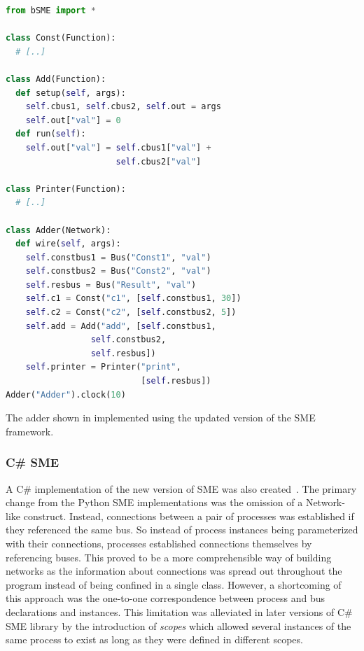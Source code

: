\begin{widefigure}
  \begin{multicols}{2}
    \small
\begin{lstlisting}[language=python]
from bSME import *

class Const(Function):
  # [..]

class Add(Function):
  def setup(self, args):
    self.cbus1, self.cbus2, self.out = args
    self.out["val"] = 0
  def run(self):
    self.out["val"] = self.cbus1["val"] +
                      self.cbus2["val"]

class Printer(Function):
  # [..]

class Adder(Network):
  def wire(self, args):
    self.constbus1 = Bus("Const1", "val")
    self.constbus2 = Bus("Const2", "val")
    self.resbus = Bus("Result", "val")
    self.c1 = Const("c1", [self.constbus1, 30])
    self.c2 = Const("c2", [self.constbus2, 5])
    self.add = Add("add", [self.constbus1,
                 self.constbus2,
                 self.resbus])
    self.printer = Printer("print",
                           [self.resbus])
Adder("Adder").clock(10)
\end{lstlisting}
  \end{multicols}
\caption{The adder shown in  implemented using the updated
  version of the SME framework.}
\label{fig:adder2}
\end{widefigure}

\subsubsection{C\# SME}
A C\# implementation of the new version of SME was also
created~\cite{skovhede2016building}. The primary change from the Python SME
implementations was the omission of a {\ttfamily Network}-like
construct. Instead, connections between a pair of processes was established if
they referenced the same bus. So instead of process instances being
parameterized with their connections, processes established connections
themselves by referencing buses. This proved to be a more comprehensible way of
building networks as the information about connections was spread out throughout
the program instead of being confined in a single class.  However, a shortcoming
of this approach was the one-to-one correspondence between process and bus
declarations and instances. This limitation was alleviated in later versions of
C\# SME library by the introduction of {\itshape scopes} which allowed several
instances of the same process to exist as long as they were defined in different
scopes.

